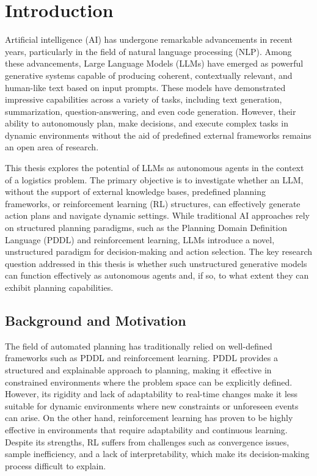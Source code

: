 \chapter{Introduction}
\label{cha:introduction}

Artificial intelligence (AI) has undergone remarkable advancements in recent
years, particularly in the field of natural language processing (NLP). Among
these advancements, Large Language Models (LLMs) have emerged as powerful generative
systems capable of producing coherent, contextually relevant, and human-like text
based on input prompts. These models have demonstrated impressive capabilities
across a variety of tasks, including text generation, summarization, question-answering,
and even code generation. However, their ability to autonomously plan, make decisions,
and execute complex tasks in dynamic environments without the aid of predefined
external frameworks remains an open area of research.

This thesis explores the potential of LLMs as autonomous agents in the context
of a logistics problem. The primary objective is to investigate whether an LLM,
without the support of external knowledge bases, predefined planning frameworks,
or reinforcement learning (RL) structures, can effectively generate action plans
and navigate dynamic settings. While traditional AI approaches rely on
structured planning paradigms, such as the Planning Domain Definition Language (PDDL)
and reinforcement learning, LLMs introduce a novel, unstructured paradigm for decision-making
and action selection. The key research question addressed in this thesis is
whether such unstructured generative models can function effectively as
autonomous agents and, if so, to what extent they can exhibit planning
capabilities.

\section{Background and Motivation}

The field of automated planning has traditionally relied on well-defined frameworks
such as PDDL and reinforcement learning. PDDL provides a structured and
explainable approach to planning, making it effective in constrained environments
where the problem space can be explicitly defined. However, its rigidity and lack
of adaptability to real-time changes make it less suitable for dynamic environments
where new constraints or unforeseen events can arise. On the other hand, reinforcement
learning has proven to be highly effective in environments that require adaptability
and continuous learning. Despite its strengths, RL suffers from challenges such as
convergence issues, sample inefficiency, and a lack of interpretability, which
make its decision-making process difficult to explain.

